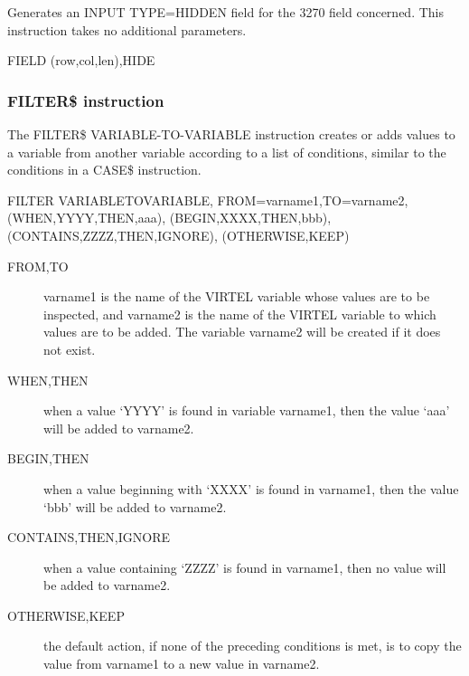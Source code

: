 \documentclass[letterpaper,10pt,english]{sphinxmanual}
\begin{document}

Generates an INPUT TYPE=HIDDEN field for the 3270 field concerned. This instruction takes no additional parameters.

\begin{sphinxVerbatim}[commandchars=\\\{\}]
FIELD\PYGZdl{} (row,col,len),HIDE
\end{sphinxVerbatim}


\subsubsection{FILTER\$ instruction}
\label{\detokenize{User_Guide:filter-instruction}}

The FILTER\$ VARIABLE-TO-VARIABLE instruction creates or adds values to a variable from another variable according to
a list of conditions, similar to the conditions in a CASE\$ instruction.

\begin{sphinxVerbatim}[commandchars=\\\{\}]
FILTER\PYGZdl{} VARIABLE\PYGZhy{}TO\PYGZhy{}VARIABLE,
FROM=\PYGZsq{}varname1\PYGZsq{},TO=\PYGZsq{}varname2\PYGZsq{},
(WHEN,\PYGZsq{}YYYY\PYGZsq{},THEN,\PYGZsq{}aaa\PYGZsq{}),
(BEGIN,\PYGZsq{}XXXX\PYGZsq{},THEN,\PYGZsq{}bbb\PYGZsq{}),
(CONTAINS,\PYGZsq{}ZZZZ\PYGZsq{},THEN,IGNORE),
(OTHERWISE,KEEP)
\end{sphinxVerbatim}
\begin{description}
\item[{FROM,TO}] \leavevmode
varname1 is the name of the VIRTEL variable whose values are to be inspected, and varname2 is the name of the VIRTEL variable to which values are to be added. The variable varname2 will be created if it does not exist.

\item[{WHEN,THEN}] \leavevmode
when a value ‘YYYY’ is found in variable varname1, then the value ‘aaa’ will be added to varname2.

\item[{BEGIN,THEN}] \leavevmode
when a value beginning with ‘XXXX’ is found in varname1, then the value ‘bbb’ will be added to varname2.

\item[{CONTAINS,THEN,IGNORE}] \leavevmode
when a value containing ‘ZZZZ’ is found in varname1, then no value will be added to varname2.

\item[{OTHERWISE,KEEP}] \leavevmode
the default action, if none of the preceding conditions is met, is to copy the value from varname1 to a new value in varname2.

\end{description}
\end{document}
